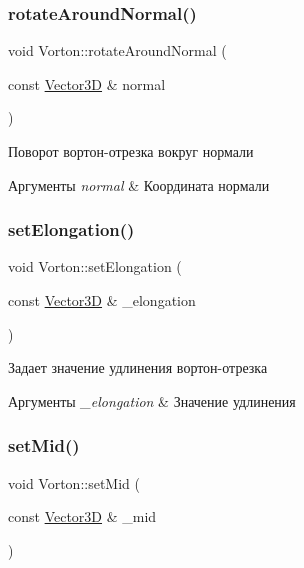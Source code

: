 \subsubsection{\texorpdfstring{rotate\+Around\+Normal()}{rotateAroundNormal()}}
{\footnotesize\ttfamily void Vorton\+::rotate\+Around\+Normal (\begin{DoxyParamCaption}\item[{const \mbox{\hyperlink{class_vector3_d}{Vector3D}} \&}]{normal }\end{DoxyParamCaption})}

Поворот вортон-\/отрезка вокруг нормали 
\begin{DoxyParams}{Аргументы}
{\em normal} & Координата нормали \\
\hline
\end{DoxyParams}
\mbox{\label{class_vorton_a70d51b5d11a7029583e480bfb45748af}} 
\subsubsection{\texorpdfstring{set\+Elongation()}{setElongation()}}
{\footnotesize\ttfamily void Vorton\+::set\+Elongation (\begin{DoxyParamCaption}\item[{const \mbox{\hyperlink{class_vector3_d}{Vector3D}} \&}]{\+\_\+elongation }\end{DoxyParamCaption})}

Задает значение удлинения вортон-\/отрезка 
\begin{DoxyParams}{Аргументы}
{\em \+\_\+elongation} & Значение удлинения \\
\hline
\end{DoxyParams}
\mbox{\label{class_vorton_a116136f55d5f22738a734a109b7bb80b}} 
\subsubsection{\texorpdfstring{set\+Mid()}{setMid()}}
{\footnotesize\ttfamily void Vorton\+::set\+Mid (\begin{DoxyParamCaption}\item[{const \mbox{\hyperlink{class_vector3_d}{Vector3D}} \&}]{\+\_\+mid }\end{DoxyParamCaption})}

